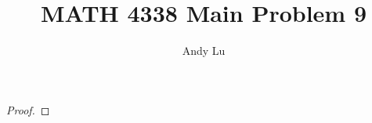 \documentclass{article}
\title{MATH 4338 Main Problem 9}
\date{}
\author{Andy Lu}
\begin{document}
  \maketitle
  \begin{proof}
    
  \end{proof}
\end{document}
